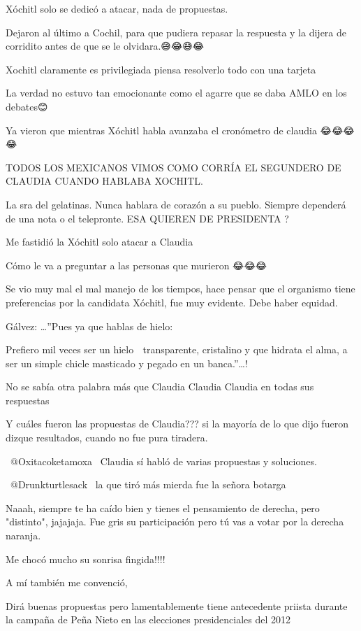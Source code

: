 Xóchitl solo se dedicó a atacar, nada de propuestas.

Dejaron al último a Cochil, para que pudiera repasar la respuesta y la dijera de corridito antes de que se le olvidara.😅😂😅😂

Xochitl claramente es privilegiada piensa resolverlo todo con una tarjeta 🤣🤣🤣🤣

La verdad no estuvo tan emocionante como el agarre que se daba AMLO en los debates😊

Ya vieron que mientras Xóchitl habla avanzaba el cronómetro de claudia 😂😂😂😂

TODOS LOS MEXICANOS VIMOS COMO CORRÍA EL SEGUNDERO DE CLAUDIA CUANDO HABLABA XOCHITL.

La sra del gelatinas. Nunca hablara de corazón a su pueblo. Siempre dependerá de una nota o el telepronte. ESA QUIEREN DE PRESIDENTA ?

Me fastidió la Xóchitl solo atacar a Claudia

Cómo le va a preguntar a las personas que murieron 😂😂😂

Se vio muy mal el mal manejo de los tiempos, hace pensar que el organismo tiene preferencias por la candidata Xóchitl, fue muy evidente. Debe haber equidad.

Gálvez: …”Pues ya que hablas de hielo:

Prefiero mil veces ser un hielo 🧊 transparente, cristalino y que hidrata el alma, a ser un simple chicle masticado y pegado en un banca.”…!

No se sabía otra palabra más que Claudia Claudia Claudia en todas sus respuestas 🤡

Y cuáles fueron las propuestas de Claudia??? si la mayoría de lo que dijo fueron dizque resultados, cuando no fue pura tiradera.

 @Oxitacoketamoxa  Claudia sí habló de varias propuestas y soluciones.

 @Drunkturtlesack  la que tiró más mierda fue la señora botarga

Naaah, siempre te ha caído bien y tienes el pensamiento de derecha, pero "distinto", jajajaja. Fue gris su participación pero tú vas a votar por la derecha naranja.

Me chocó mucho su sonrisa fingida!!!!

A mí también me convenció,

Dirá buenas propuestas pero lamentablemente tiene antecedente priista durante la campaña de Peña Nieto en las elecciones presidenciales del 2012

